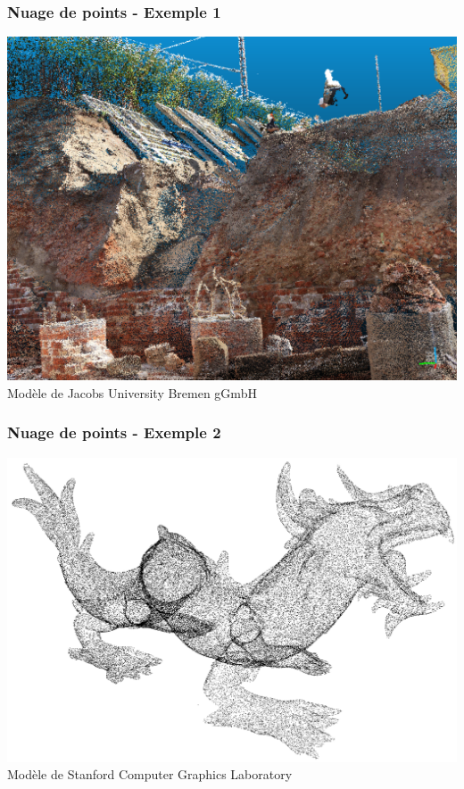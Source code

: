 \documentclass{beamer}
\begin{document}
\begin{frame}
\frametitle{Nuage de points - Exemple 1}
	\center
	\includegraphics[width=.8\textwidth]{tower_screenshot.png} \\
	\footnotesize{Modèle de Jacobs University Bremen gGmbH}
\end{frame}

\begin{frame}
\frametitle{Nuage de points - Exemple 2}
	\center
	\includegraphics[width=.9\textwidth]{dragon_screenshot.png} \\
	\footnotesize{Modèle de Stanford Computer Graphics Laboratory}
\end{frame}
\end{document}
